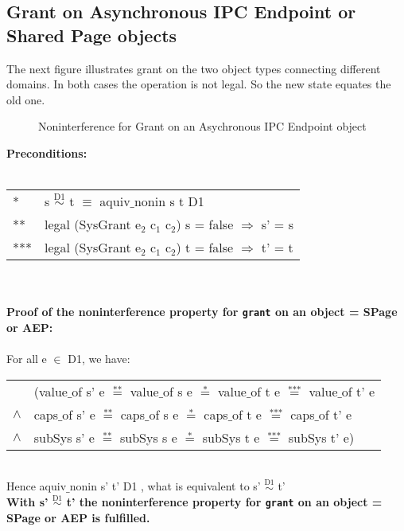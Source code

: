 \subsection{Grant on Asynchronous IPC Endpoint or Shared Page objects}
The next figure illustrates grant on the two object types connecting different domains. In both cases the operation is not legal. So the new state equates the old one.
\begin{figure}[H]
\caption{Noninterference for Grant on an Asychronous IPC Endpoint object}
\end{figure}
\textbf{Preconditions:} \\ \\
\begin{tabular}{ll}
* & s $\overset{\text{D1}}{\sim}$ t $\equiv$ aquiv$\_$nonin s t D1	\\ 
** & legal (SysGrant e$_2$ c$_1$ c$_2$) s = false $\Rightarrow$ s' = s \\ 
*** & legal (SysGrant e$_2$ c$_1$ c$_2$) t = false $\Rightarrow$ t' = t
\end{tabular}\\ \\ 
\textbf{Proof of the noninterference property for \texttt{grant} on an object = SPage or AEP:}\\ \\
For all e $\in$ D1, we have: \\ 
\begin{tabular}{ll}
& (value$\_$of s' e $\overset{\text{**}}{=}$ value$\_$of s e $\overset{\text{*}}{=}$ value$\_$of t e $\overset{\text{***}}{=}$ value$\_$of t' e \\
$\wedge$ & caps$\_$of s' e $\overset{\text{**}}{=}$ caps$\_$of s e $\overset{\text{*}}{=}$ caps$\_$of t e $\overset{\text{***}}{=}$ caps$\_$of t' e \\
$\wedge$ & subSys s' e $\overset{\text{**}}{=}$ subSys s e $\overset{\text{*}}{=}$ subSys t e $\overset{\text{***}}{=}$ subSys t' e)
\end{tabular} \\
Hence aquiv$\_$nonin s' t' D1 , what is equivalent to s' $\overset{\text{D1}}{\sim}$ t' \\ 
\textbf{With s' $\overset{\text{D1}}{\sim}$ t' the noninterference property for \texttt{grant} on an object = SPage or AEP is fulfilled.} 